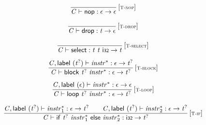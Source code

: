 $$
\begin{array}{@{}c@{}}\displaystyle
\frac{
}{
{\mathit{C}} \vdash \mathsf{nop} : \epsilon \rightarrow \epsilon
} \, {[\textsc{\scriptsize T{-}nop}]}
\qquad
\end{array}
$$

$$
\begin{array}{@{}c@{}}\displaystyle
\frac{
}{
{\mathit{C}} \vdash \mathsf{drop} : {\mathit{t}} \rightarrow \epsilon
} \, {[\textsc{\scriptsize T{-}drop}]}
\qquad
\end{array}
$$

\vspace{1ex}

$$
\begin{array}{@{}c@{}}\displaystyle
\frac{
}{
{\mathit{C}} \vdash \mathsf{select} : {\mathit{t}}~{\mathit{t}}~\mathsf{i{\scriptstyle32}} \rightarrow {\mathit{t}}
} \, {[\textsc{\scriptsize T{-}select}]}
\qquad
\end{array}
$$

\vspace{1ex}

$$
\begin{array}{@{}c@{}}\displaystyle
\frac{
{\mathit{C}}, \mathsf{label}~({{\mathit{t}}^?}) \vdash {{\mathit{instr}}^\ast} : \epsilon \rightarrow {{\mathit{t}}^?}
}{
{\mathit{C}} \vdash \mathsf{block}~{{\mathit{t}}^?}~{{\mathit{instr}}^\ast} : \epsilon \rightarrow {{\mathit{t}}^?}
} \, {[\textsc{\scriptsize T{-}block}]}
\qquad
\end{array}
$$

$$
\begin{array}{@{}c@{}}\displaystyle
\frac{
{\mathit{C}}, \mathsf{label}~(\epsilon) \vdash {{\mathit{instr}}^\ast} : \epsilon \rightarrow \epsilon
}{
{\mathit{C}} \vdash \mathsf{loop}~{{\mathit{t}}^?}~{{\mathit{instr}}^\ast} : \epsilon \rightarrow {{\mathit{t}}^?}
} \, {[\textsc{\scriptsize T{-}loop}]}
\qquad
\end{array}
$$

$$
\begin{array}{@{}c@{}}\displaystyle
\frac{
{\mathit{C}}, \mathsf{label}~({{\mathit{t}}^?}) \vdash {{\mathit{instr}}_{{1}}^\ast} : \epsilon \rightarrow {{\mathit{t}}^?}
 \qquad
{\mathit{C}}, \mathsf{label}~({{\mathit{t}}^?}) \vdash {{\mathit{instr}}_{{2}}^\ast} : \epsilon \rightarrow {{\mathit{t}}^?}
}{
{\mathit{C}} \vdash \mathsf{if}~{{\mathit{t}}^?}~{{\mathit{instr}}_{{1}}^\ast}~\mathsf{else}~{{\mathit{instr}}_{{2}}^\ast} : \mathsf{i{\scriptstyle32}} \rightarrow {{\mathit{t}}^?}
} \, {[\textsc{\scriptsize T{-}if}]}
\qquad
\end{array}
$$

